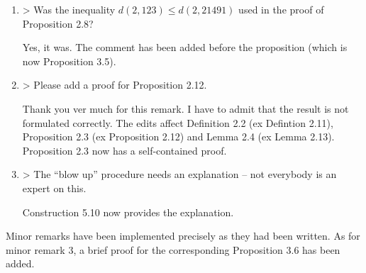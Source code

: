 \documentclass[a4paper,14pt]{article} %
\begin{document}
\begin{enumerate}
	\item

		> Was the inequality $d(2, 123) \leq d(2, 21491)$ used in the proof of Proposition 2.8?

		Yes, it was.
		The comment has been added before the proposition (which is now Proposition 3.5).


	\item

		> Please add a proof for Proposition 2.12.

		Thank you ver much for this remark.
		I have to admit that the result is not formulated correctly.
		The edits affect Definition 2.2 (ex Defintion 2.11), Proposition 2.3 (ex Proposition 2.12) and Lemma 2.4 (ex Lemma 2.13).
		Proposition 2.3 now has a self-contained proof.

	\item

		> The “blow up” procedure needs an explanation – not everybody is an expert on this.

		Construction 5.10 now provides the explanation.

\end{enumerate}

Minor remarks have been implemented precisely as they had been written.
As for minor remark 3, a brief proof for the corresponding Proposition 3.6 has been added.







\end{document}

